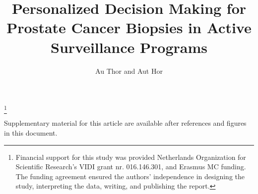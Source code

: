 \documentclass[Review,sagev,times]{sagej}
\begin{document}

\title{Personalized Decision Making for Prostate Cancer Biopsies in Active Surveillance Programs}

\author{Au Thor and Aut Hor}







\maketitle

\footnote{Financial support for this study was provided Netherlands Organization for Scientific Research's VIDI grant nr. 016.146.301, and Erasmus MC funding. The funding agreement ensured the authors’ independence in designing the study, interpreting the data, writing, and publishing the report.}
\thefootnote








\begin{sm}
Supplementary material for this article are available after references and figures in this document.
\end{sm}



\end{document}
